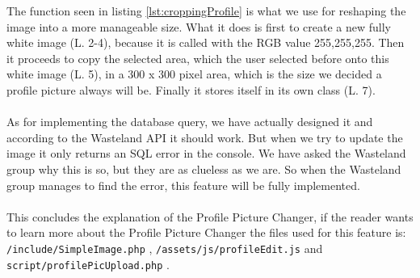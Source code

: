 The function seen in listing \ref{lst:croppingProfile} is what we use for reshaping the image into a more manageable size. What it does is first to create a new fully white image (L. 2-4), because it is called with the RGB value 255,255,255. Then it proceeds to copy the selected area, which the user selected before onto this white image (L. 5), in a 300 x 300 pixel area, which is the size we decided a profile picture always will be. Finally it stores itself in its own class (L. 7).\\
\\
As for implementing the database query, we have actually designed it and according to the Wasteland API \citep{wastelandApi} it should work. But when we try to update the image it only returns an SQL error in the console. We have asked the Wasteland group why this is so, but they are as clueless as we are. So when the Wasteland group manages to find the error, this feature will be fully implemented.\\
\\
This concludes the explanation of the Profile Picture Changer, if the reader wants to learn more about the Profile Picture Changer the files used for this feature is: \texttt{/include/SimpleImage.php} , \texttt{/assets/js/profileEdit.js} and \texttt{script/profilePicUpload.php} .









